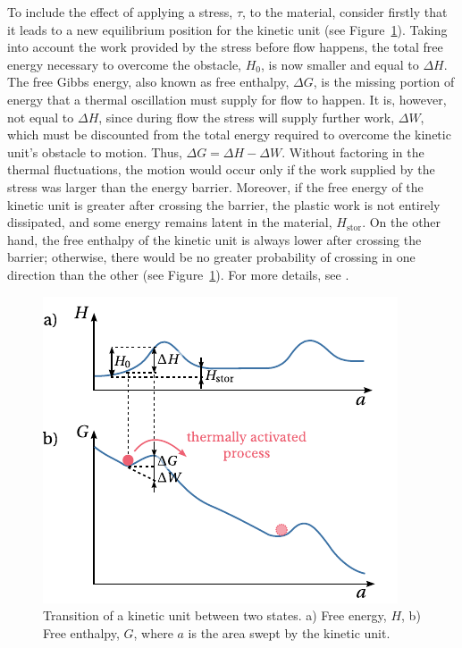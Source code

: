 To include the effect of applying a stress, $\tau$, to the material, consider firstly that it leads to a new equilibrium position for the kinetic unit (see Figure~\ref{fig:site_model_theory}).
Taking into account the work provided by the stress before flow happens, the total free energy necessary to overcome the obstacle, $H_0$, is now smaller and equal to $\Delta H$.
The free Gibbs energy, also known as free enthalpy, $\Delta G$, is the missing portion of energy that a thermal oscillation must supply for flow to happen.
It is, however, not equal to $\Delta H$, since during flow the stress will supply further work, $\Delta W$, which
must be discounted from the total energy required to overcome the kinetic unit's obstacle to motion.
Thus, $\Delta G = \Delta H - \Delta W$.
Without factoring in the thermal fluctuations, the motion would occur only if the work supplied by the stress was larger than the energy barrier.
Moreover, if the free energy of the kinetic unit is greater after crossing the barrier, the plastic work is not entirely dissipated, and some energy remains latent in the material, $H_\text{stor}$.
On the other hand, the free enthalpy of the kinetic unit is always lower after crossing the barrier; otherwise, there would be no greater probability of crossing in one direction than the other (see Figure~\ref{fig:site_model_theory}).
For more details, see \cite{kocks1975thermodynamics}.
\begin{figure}
	\centering
	\includegraphics{figures/site_model_theory}
	\caption{Transition of a kinetic unit between two states. a) Free energy, $H$, b) Free enthalpy, $G$, where $a$ is the area swept by the kinetic unit.}
\label{fig:site_model_theory}
\end{figure}

